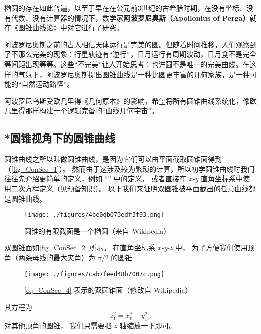 
\begin{issues}
\issueDraft
\end{issues}





椭圆的存在如此普遍，以至于早在在公元前3世纪的古希腊时期，在没有坐标、没有代数、没有计算器的情况下，数学家\textbf{阿波罗尼奥斯（Apollonius of Perga）}就在《圆锥曲线论》中对它进行了研究。

阿波罗尼奥斯之前的古人相信天体运行是完美的圆。但随着时间推移，人们观察到了不那么完美的现象：行星轨迹有“逆行”，日月运行有周期波动，日月食不是完全等间距出现等等。这些“不完美”让人开始思考：也许圆不是唯一的完美曲线。在这样的气氛下，阿波罗尼奥斯提出圆锥曲线是一种比圆更丰富的几何家族，是一种可能的“自然运动路径”。


阿波罗尼乌斯受欧几里得《几何原本》的影响，希望将所有圆锥曲线系统化，像欧几里得那样构建一个逻辑完备的“曲线几何宇宙”。


\subsection{*圆锥视角下的圆锥曲线}

圆锥曲线之所以叫做圆锥曲线，是因为它们可以由平面截取圆锥面得到（\autoref{fig_ConSec_1}）。 然而由于这涉及较为繁琐的计算，所以初学圆锥曲线时我们往往先介绍更简单的定义，例如 “” 中的定义， 或者直接在 $x$-$y$ 直角坐标系中使用二次方程定义（见预备知识）。 以下我们来证明双圆锥被平面截出的任意曲线都是圆锥曲线。

\begin{figure}[ht]
\centering
\texttt{[image: ./figures/4be0db073edf3f93.png]}
\caption{圆锥的有限截面是一个椭圆（来自 Wikipedia）} \label{fig_ConSec_1}
\end{figure}

双圆锥面如\autoref{fig_ConSec_2} 所示。 在直角坐标系 $x$-$y$-$z$ 中， 为了方便我们使用顶角（两条母线的最大夹角）为 $\pi/2$ 的圆锥
\begin{figure}[ht]
\centering
\texttt{[image: ./figures/cab7feed48b7007c.png]}
\caption{\autoref{eq_ConSec_4} 表示的双圆锥面（修改自 Wikipedia）} \label{fig_ConSec_2}
\end{figure}
其方程为
\begin{equation}\label{eq_ConSec_4}
z_1^2 = x_1^2 + y_1^2~.
\end{equation}
对其他顶角的圆锥， 我们只需要把 $z$ 轴缩放一下即可。

